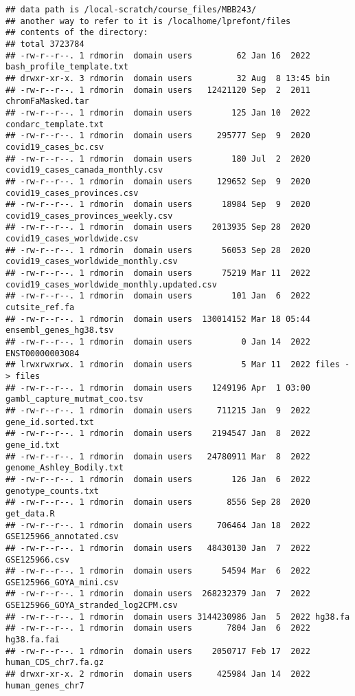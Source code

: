 \documentclass[
]{article}
\begin{document}
\begin{verbatim}
## data path is /local-scratch/course_files/MBB243/
## another way to refer to it is /localhome/lprefont/files
## contents of the directory:
## total 3723784
## -rw-r--r--. 1 rdmorin  domain users         62 Jan 16  2022 bash_profile_template.txt
## drwxr-xr-x. 3 rdmorin  domain users         32 Aug  8 13:45 bin
## -rw-r--r--. 1 rdmorin  domain users   12421120 Sep  2  2011 chromFaMasked.tar
## -rw-r--r--. 1 rdmorin  domain users        125 Jan 10  2022 condarc_template.txt
## -rw-r--r--. 1 rdmorin  domain users     295777 Sep  9  2020 covid19_cases_bc.csv
## -rw-r--r--. 1 rdmorin  domain users        180 Jul  2  2020 covid19_cases_canada_monthly.csv
## -rw-r--r--. 1 rdmorin  domain users     129652 Sep  9  2020 covid19_cases_provinces.csv
## -rw-r--r--. 1 rdmorin  domain users      18984 Sep  9  2020 covid19_cases_provinces_weekly.csv
## -rw-r--r--. 1 rdmorin  domain users    2013935 Sep 28  2020 covid19_cases_worldwide.csv
## -rw-r--r--. 1 rdmorin  domain users      56053 Sep 28  2020 covid19_cases_worldwide_monthly.csv
## -rw-r--r--. 1 rdmorin  domain users      75219 Mar 11  2022 covid19_cases_worldwide_monthly.updated.csv
## -rw-r--r--. 1 rdmorin  domain users        101 Jan  6  2022 cutsite_ref.fa
## -rw-r--r--. 1 rdmorin  domain users  130014152 Mar 18 05:44 ensembl_genes_hg38.tsv
## -rw-r--r--. 1 rdmorin  domain users          0 Jan 14  2022 ENST00000003084
## lrwxrwxrwx. 1 rdmorin  domain users          5 Mar 11  2022 files -> files
## -rw-r--r--. 1 rdmorin  domain users    1249196 Apr  1 03:00 gambl_capture_mutmat_coo.tsv
## -rw-r--r--. 1 rdmorin  domain users     711215 Jan  9  2022 gene_id.sorted.txt
## -rw-r--r--. 1 rdmorin  domain users    2194547 Jan  8  2022 gene_id.txt
## -rw-r--r--. 1 rdmorin  domain users   24780911 Mar  8  2022 genome_Ashley_Bodily.txt
## -rw-r--r--. 1 rdmorin  domain users        126 Jan  6  2022 genotype_counts.txt
## -rw-r--r--. 1 rdmorin  domain users       8556 Sep 28  2020 get_data.R
## -rw-r--r--. 1 rdmorin  domain users     706464 Jan 18  2022 GSE125966_annotated.csv
## -rw-r--r--. 1 rdmorin  domain users   48430130 Jan  7  2022 GSE125966.csv
## -rw-r--r--. 1 rdmorin  domain users      54594 Mar  6  2022 GSE125966_GOYA_mini.csv
## -rw-r--r--. 1 rdmorin  domain users  268232379 Jan  7  2022 GSE125966_GOYA_stranded_log2CPM.csv
## -rw-r--r--. 1 rdmorin  domain users 3144230986 Jan  5  2022 hg38.fa
## -rw-r--r--. 1 rdmorin  domain users       7804 Jan  6  2022 hg38.fa.fai
## -rw-r--r--. 1 rdmorin  domain users    2050717 Feb 17  2022 human_CDS_chr7.fa.gz
## drwxr-xr-x. 2 rdmorin  domain users     425984 Jan 14  2022 human_genes_chr7

\end{verbatim}
\end{document}
